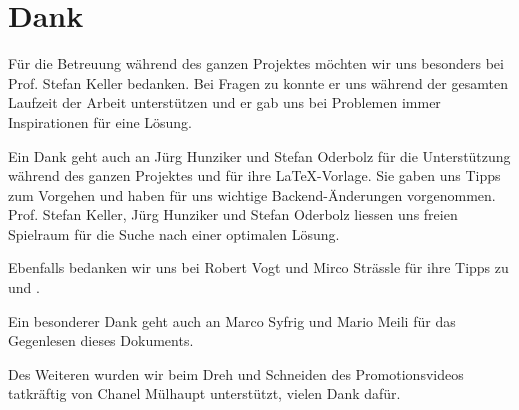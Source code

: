 \chapter*{Dank}
\thispagestyle{scrheadings}

Für die Betreuung während des ganzen Projektes möchten wir uns besonders bei Prof. Stefan Keller  bedanken.
Bei Fragen zu  konnte er uns während der gesamten Laufzeit der Arbeit unterstützen und er gab uns bei Problemen immer Inspirationen für eine Lösung. 

Ein Dank geht auch an Jürg Hunziker und Stefan Oderbolz für die Unterstützung während des ganzen Projektes und für ihre \LaTeX{}-Vorlage.
Sie gaben uns Tipps zum Vorgehen und haben für uns wichtige Backend-Änderungen vorgenommen. 
Prof. Stefan Keller, Jürg Hunziker und Stefan Oderbolz liessen uns freien Spielraum für die Suche nach einer optimalen Lösung.

Ebenfalls bedanken wir uns bei Robert Vogt und Mirco Strässle für ihre Tipps zu  und .

Ein besonderer Dank geht auch an Marco Syfrig und Mario Meili für das Gegenlesen dieses Dokuments.

Des Weiteren wurden wir beim Dreh und Schneiden des Promotionsvideos tatkräftig von Chanel Mülhaupt unterstützt, vielen Dank dafür.